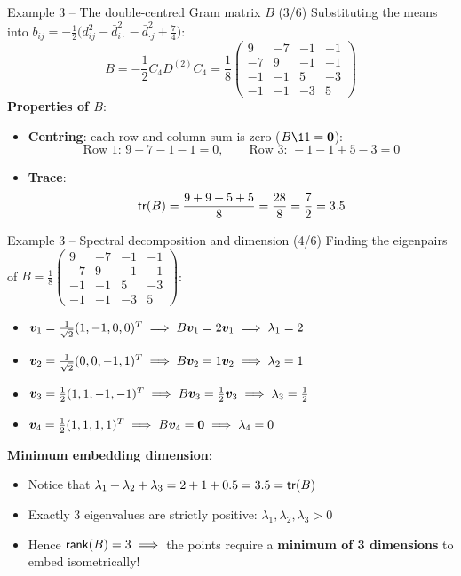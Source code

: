 \documentclass[aspectratio=169]{beamer}\usepackage[]{graphicx}\usepackage[]{xcolor}
\begin{document}
\begin{frame}{Example 3 -- The double-centred Gram matrix $B$ (3/6)}
Substituting the means into $b_{ij} = -\frac{1}{2}\big(d_{ij}^2 - \bar{d}_{i\cdot}^2 - \bar{d}_{\cdot j}^2 + \frac{7}{4}\big)$:
\[
B = -\frac{1}{2} C_4 D^{(2)} C_4 = \frac{1}{8}\begin{pmatrix}
9 & -7 & -1 & -1 \\
-7 & 9 & -1 & -1 \\
-1 & -1 & 5 & -3 \\
-1 & -1 & -3 & 5
\end{pmatrix}
\]
\vfill
\textbf{Properties of $B$}:
\begin{itemize}
\item \textbf{Centring}: each row and column sum is zero ($B\11 = \b0$):
\[
\text{Row 1: } 9 - 7 - 1 - 1 = 0, \qquad \text{Row 3: } -1 - 1 + 5 - 3 = 0
\]
\item \textbf{Trace}:
\[
\mathsf{tr}(B) = \frac{9 + 9 + 5 + 5}{8} = \frac{28}{8} = \frac{7}{2} = 3.5
\]
\end{itemize}
\end{frame}

\begin{frame}{Example 3 -- Spectral decomposition and dimension (4/6)}
Finding the eigenpairs of $B = \frac{1}{8}\begin{pmatrix} 9 & -7 & -1 & -1 \\ -7 & 9 & -1 & -1 \\ -1 & -1 & 5 & -3 \\ -1 & -1 & -3 & 5 \end{pmatrix}$:
\vfill
\begin{itemize}
\item $\bm{v}_1 = \frac{1}{\sqrt{2}}(1, -1, 0, 0)^T \implies B\bm{v}_1 = 2\bm{v}_1 \implies \lambda_1 = 2$
\item $\bm{v}_2 = \frac{1}{\sqrt{2}}(0, 0, -1, 1)^T \implies B\bm{v}_2 = 1\bm{v}_2 \implies \lambda_2 = 1$
\item $\bm{v}_3 = \frac{1}{2}(1, 1, -1, -1)^T \implies B\bm{v}_3 = \frac{1}{2}\bm{v}_3 \implies \lambda_3 = \frac{1}{2}$
\item $\bv_4 = \frac{1}{2}(1, 1, 1, 1)^T \implies B\bv_4 = \b0 \implies \lambda_4 = 0$
\end{itemize}
\vfill
\textbf{Minimum embedding dimension}:
\begin{itemize}
\item Notice that $\lambda_1 + \lambda_2 + \lambda_3 = 2 + 1 + 0.5 = 3.5 = \mathsf{tr}(B)$
\item Exactly $3$ eigenvalues are strictly positive: $\lambda_1, \lambda_2, \lambda_3 > 0$
\item Hence $\mathsf{rank}(B) = 3 \implies$ the points require a \textbf{minimum of 3 dimensions} to embed isometrically!
\end{itemize}
\end{frame}
\end{document}

